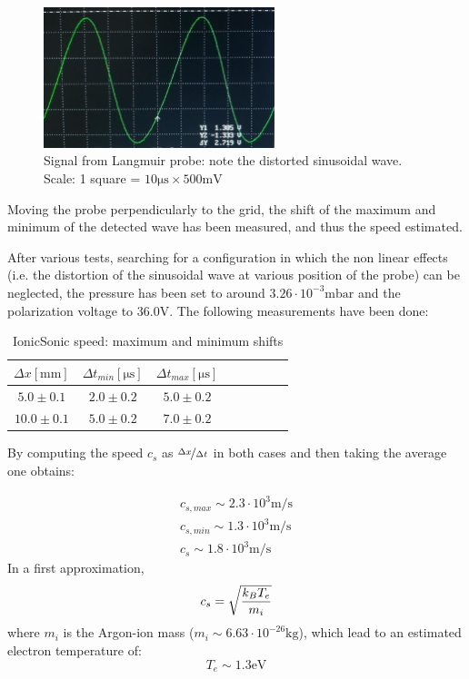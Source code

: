 \documentclass[11pt,a4 paper]{article}
\let\oldfrac\frac
\renewcommand{\frac}[3][d]{\ifthenelse{\equal{#1}{d}}{\oldfrac{#2}{#3}}{\nicefrac{#2}{#3}}}
\begin{document}
\begin{figure}[H]
  \centering
  \includegraphics[width=0.6\textwidth]{img/ionicsonic/oscill.jpg}
  \caption{Signal from Langmuir probe: note the distorted sinusoidal wave. Scale: 1 square = $10\si{\micro\second}\times500\si{\milli\volt}$}
  \label{fig:isspeed:oscill}
\end{figure}

Moving the probe perpendicularly to the grid, the shift of the maximum and minimum of the detected wave has been measured, and thus the speed estimated.

After various tests, searching for a configuration in which the non linear effects (i.e. the distortion of the sinusoidal wave at various position of the probe) can be neglected, the pressure has been set to around $3.26\cdot10^{-3}\si{\milli\bar}$ and the polarization voltage to $36.0\si{\volt}$. The following measurements have been done:
\begin{table}[H]
  \centering
  \begin{tabular}{cccccccc}
    \toprule
    $\Delta x [\si{\milli\metre}]$ & $\Delta t_{min} [\si{\micro\second}]$ & $\Delta t_{max} [\si{\micro\second}]$ \\
    \midrule
    $5.0\pm0.1$ & $2.0\pm0.2$ & $5.0\pm0.2$\\
    $10.0\pm0.1$ & $5.0\pm0.2$ & $7.0\pm0.2$\\
    \bottomrule
  \end{tabular}
  \caption{IonicSonic speed: maximum and minimum shifts}
  \label{tab:isspeed}
\end{table}

By computing the speed $c_s$ as $\frac[f]{\Delta x}{\Delta t}$ in both cases and then taking the average one obtains:

\begin{gather*}
  c_{s,max} \sim 2.3\cdot10^{3} \si{\metre\per\second} \\
  c_{s,min} \sim 1.3\cdot10^{3} \si{\metre\per\second} \\
  c_s \sim 1.8\cdot10^{3} \si{\metre\per\second}
\end{gather*}
In a first approximation,
\begin{equation*}
  c_s = \sqrt{\frac{k_B T_e}{m_i}}
\end{equation*}
where $m_i$ is the Argon-ion mass ($m_i\sim6.63\cdot10^{-26}\si{\kilo\gram}$), which lead to an estimated electron temperature of:
\begin{equation*}
  T_e \sim 1.3\si{\electronvolt}
\end{equation*}
\end{document}
